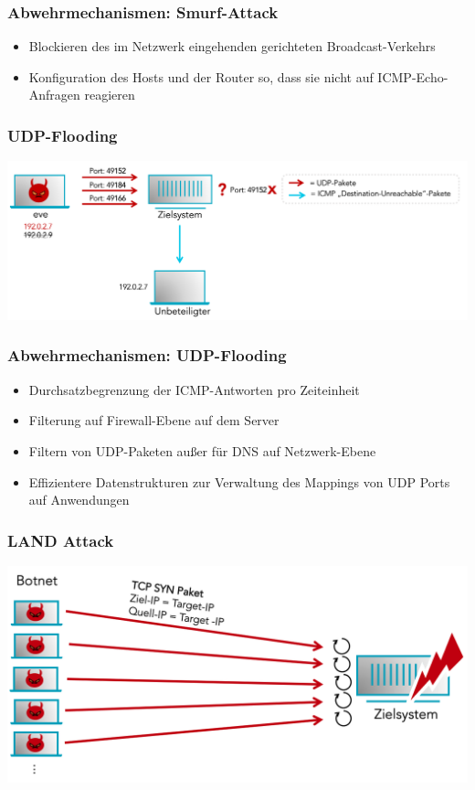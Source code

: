 \documentclass{beamer}
\begin{document}
\begin{frame}
	\frametitle{Abwehrmechanismen: Smurf-Attack}
	\begin{itemize}
		\item Blockieren des im Netzwerk eingehenden gerichteten Broadcast-Verkehrs
		\item Konfiguration des Hosts und der Router so, dass sie nicht auf ICMP-Echo-Anfragen reagieren
	\end{itemize}
\end{frame}

\begin{frame}
	\frametitle{UDP-Flooding}
	\begin{center}
		\includegraphics[width=0.9\linewidth]{img/udp}
	\end{center}
\end{frame}

\begin{frame}
	\frametitle{Abwehrmechanismen: UDP-Flooding}
	\begin{itemize}
		\item Durchsatzbegrenzung der ICMP-Antworten pro Zeiteinheit
		\item Filterung auf Firewall-Ebene auf dem Server
		\item Filtern von UDP-Paketen außer für DNS auf Netzwerk-Ebene
		\item Effizientere Datenstrukturen zur Verwaltung des Mappings von UDP Ports auf Anwendungen
	\end{itemize}
\end{frame}

\begin{frame}
	\frametitle{LAND Attack}
	\begin{center}
		\includegraphics[width=0.9\linewidth]{img/Land}
	\end{center}
\end{frame}
\end{document}
